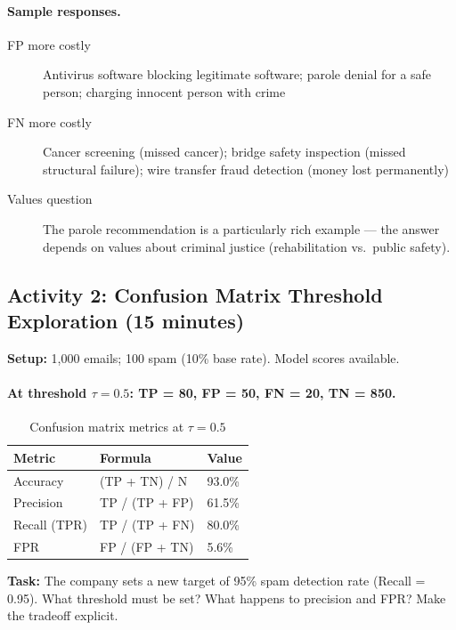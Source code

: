\paragraph{Sample responses.}
\begin{description}
    \item[FP more costly] Antivirus software blocking legitimate software; parole denial for a safe person; charging innocent person with crime
    \item[FN more costly] Cancer screening (missed cancer); bridge safety inspection (missed structural failure); wire transfer fraud detection (money lost permanently)
    \item[Values question] The parole recommendation is a particularly rich example --- the answer depends on values about criminal justice (rehabilitation vs.\ public safety).
\end{description}

\subsection{Activity 2: Confusion Matrix Threshold Exploration (15 minutes)}

\textbf{Setup:} 1,000 emails; 100 spam (10\% base rate). Model scores available.

\paragraph{At threshold $\tau = 0.5$: TP = 80, FP = 50, FN = 20, TN = 850.}

\begin{table}[htbp]
\caption{Confusion matrix metrics at $\tau = 0.5$}
\label{tab:confusion-ch04}
\centering
\begin{tabular}{@{}lll@{}}
\toprule
\textbf{Metric} & \textbf{Formula} & \textbf{Value} \\
\midrule
Accuracy & (TP + TN) / N & 93.0\% \\
Precision & TP / (TP + FP) & 61.5\% \\
Recall (TPR) & TP / (TP + FN) & 80.0\% \\
FPR & FP / (FP + TN) & 5.6\% \\
\bottomrule
\end{tabular}
\end{table}

\textbf{Task:} The company sets a new target of 95\% spam detection rate (Recall = 0.95). What threshold must be set? What happens to precision and FPR? Make the tradeoff explicit.

